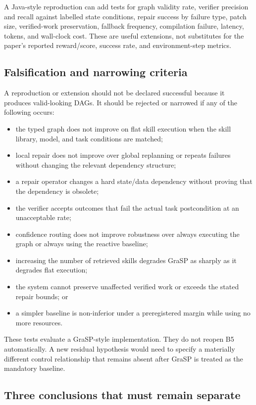 A Java-style reproduction can add tests for graph validity rate, verifier precision and recall against labelled state conditions, repair success by failure type, patch size, verified-work preservation, fallback frequency, compilation failure, latency, tokens, and wall-clock cost. These are useful extensions, not substitutes for the paper's reported reward/score, success rate, and environment-step metrics.

\subsection{Falsification and narrowing criteria}

A reproduction or extension should not be declared successful because it produces valid-looking DAGs. It should be rejected or narrowed if any of the following occurs:

\begin{itemize}
  \item the typed graph does not improve on flat skill execution when the skill library, model, and task conditions are matched;
  \item local repair does not improve over global replanning or repeats failures without changing the relevant dependency structure;
  \item a repair operator changes a hard state/data dependency without proving that the dependency is obsolete;
  \item the verifier accepts outcomes that fail the actual task postcondition at an unacceptable rate;
  \item confidence routing does not improve robustness over always executing the graph or always using the reactive baseline;
  \item increasing the number of retrieved skills degrades GraSP as sharply as it degrades flat execution;
  \item the system cannot preserve unaffected verified work or exceeds the stated repair bounds; or
  \item a simpler baseline is non-inferior under a preregistered margin while using no more resources.
\end{itemize}

These tests evaluate a GraSP-style implementation. They do not reopen B5 automatically. A new residual hypothesis would need to specify a materially different control relationship that remains absent after GraSP is treated as the mandatory baseline.

\subsection{Three conclusions that must remain separate}

